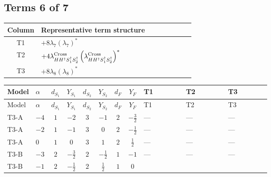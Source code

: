\documentclass[8pt]{article}
\begin{document}
\begin{landscape}
\subsection*{Terms 6 of 7}
\begin{center}
\begin{tabular}{@{}c >{\raggedright\arraybackslash}p{0.82\linewidth}@{}}
\toprule
Column & Representative term structure \\
\midrule
T1 & \(\displaystyle +8 {\lambda_{7}} \left({\lambda_{7}}\right)^{*}\) \\
\midrule
T2 & \(\displaystyle +4 {\lambda_{H H^\dagger S_1^\dagger S_2^\dagger}^{\rm Cross}} \left({\lambda_{H H^\dagger S_1^\dagger S_2^\dagger}^{\rm Cross}}\right)^{*}\) \\
\midrule
T3 & \(\displaystyle +8 {\lambda_{8}} \left({\lambda_{8}}\right)^{*}\) \\
\midrule
\bottomrule
\end{tabular}
\end{center}
\smallskip
\tiny
\begin{longtable}{@{}llcccccc >{\raggedright\arraybackslash}p{0.21\linewidth} >{\raggedright\arraybackslash}p{0.21\linewidth} >{\raggedright\arraybackslash}p{0.21\linewidth}@{}}
\toprule
Model & $\alpha$ & $d_{S_1}$ & $Y_{S_1}$ & $d_{S_2}$ & $Y_{S_2}$ & $d_F$ & $Y_F$ & T1 & T2 & T3 \\
\midrule
\endfirsthead
\toprule
Model & $\alpha$ & $d_{S_1}$ & $Y_{S_1}$ & $d_{S_2}$ & $Y_{S_2}$ & $d_F$ & $Y_F$ & T1 & T2 & T3 \\
\midrule
\endhead
T3-A & $-4$ & $1$ & $-2$ & $3$ & $-1$ & $2$ & $-\frac{3}{2}$ & --- & --- & --- \\
\midrule
T3-A & $-2$ & $1$ & $-1$ & $3$ & $0$ & $2$ & $-\frac{1}{2}$ & --- & --- & --- \\
\midrule
T3-A & $0$ & $1$ & $0$ & $3$ & $1$ & $2$ & $\frac{1}{2}$ & --- & --- & --- \\
\midrule
T3-B & $-3$ & $2$ & $-\frac{3}{2}$ & $2$ & $-\frac{1}{2}$ & $1$ & $-1$ & --- & --- & --- \\
\midrule
T3-B & $-1$ & $2$ & $-\frac{1}{2}$ & $2$ & $\frac{1}{2}$ & $1$ & $0$ & \scriptsize\adjustbox{max width=\linewidth}{$\begin{gathered} +8 {\lambda_{7}} \left({\lambda_{7}}\right)^{*}\end{gathered}$} & \scriptsize\adjustbox{max width=\linewidth}{$\begin{gathered} +4 {\lambda_{H H^\dagger S_1^\dagger S_2^\dagger}^{\rm Cross}} \left({\lambda_{H H^\dagger S_1^\dagger S_2^\dagger}^{\rm Cross}}\right)^{*}\end{gathered}$} & \scriptsize\adjustbox{max width=\linewidth}{$\begin{gathered} +8 {\lambda_{8}} \left({\lambda_{8}}\right)^{*}\end{gathered}$} \\

\end{longtable}
\end{landscape}
\end{document}
